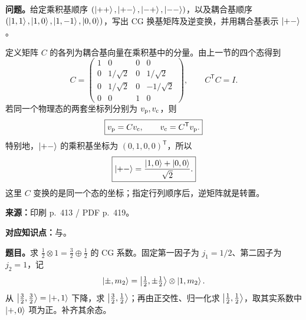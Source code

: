 \textbf{问题。}给定乘积基顺序 $(\left|++\right\rangle,\left|+-\right\rangle,\left|-+\right\rangle,\left|--\right\rangle)$，以及耦合基顺序 $(\left|1,1\right\rangle,\left|1,0\right\rangle,\left|1,-1\right\rangle,\left|0,0\right\rangle)$，写出 CG 换基矩阵及逆变换，并用耦合基表示 $\left|+-\right\rangle$。

\begin{checkedsolution}
定义矩阵 $C$ 的各列为耦合基向量在乘积基中的分量。由上一节的四个态得到
\begin{equation}
  C=\begin{pmatrix}
    1&0&0&0\\
    0&1/\sqrt2&0&1/\sqrt2\\
    0&1/\sqrt2&0&-1/\sqrt2\\
    0&0&1&0
  \end{pmatrix},\qquad C^{\mathsf T}C=I.
\end{equation}
若同一个物理态的两套坐标列分别为 $v_{\rm p},v_{\rm c}$，则
\begin{equation}
  \boxed{v_{\rm p}=Cv_{\rm c},\qquad v_{\rm c}=C^{\mathsf T}v_{\rm p}.}
\end{equation}
特别地，$\left|+-\right\rangle$ 的乘积基坐标为 $(0,1,0,0)^{\mathsf T}$，所以
\begin{equation}
  \boxed{\left|+-\right\rangle=\frac{\left|1,0\right\rangle+\left|0,0\right\rangle}{\sqrt2}.}
\end{equation}
这里 $C$ 变换的是同一个态的坐标；指定行列顺序后，逆矩阵就是转置。
\end{checkedsolution}

\textbf{来源：}印刷 p.~413 / PDF p.~419。

\textbf{对应知识点：}与。

\textbf{题目。}求 $\tfrac12\otimes1=\tfrac32\oplus\tfrac12$ 的 CG 系数。固定第一因子为 $j_1=1/2$、第二因子为 $j_2=1$，记
\begin{equation}
  \left|\pm,m_2\right\rangle=\left|\tfrac12,\pm\tfrac12\right\rangle\otimes\left|1,m_2\right\rangle.
\end{equation}
从 $\left|\tfrac32,\tfrac32\right\rangle=\left|+,1\right\rangle$ 下降，求 $\left|\tfrac32,\tfrac12\right\rangle$；再由正交性、归一化求 $\left|\tfrac12,\tfrac12\right\rangle$，取其实系数中 $\left|+,0\right\rangle$ 项为正。补齐其余态。

